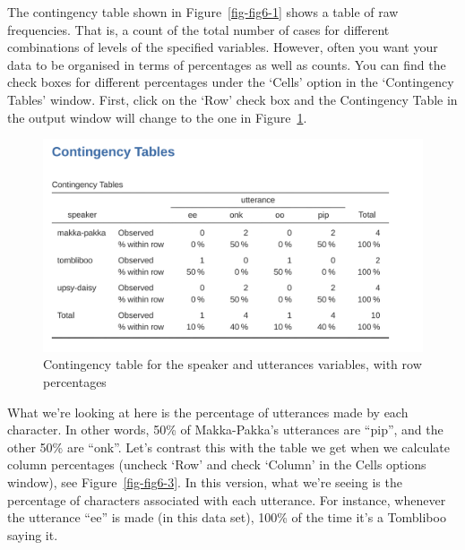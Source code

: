 \documentclass[
  a4paper,
]{book}
\begin{document}
The contingency table shown in Figure~\ref{fig-fig6-1} shows a table of
raw frequencies. That is, a count of the total number of cases for
different combinations of levels of the specified variables. However,
often you want your data to be organised in terms of percentages as well
as counts. You can find the check boxes for different percentages under
the `Cells' option in the `Contingency Tables' window. First, click on
the `Row' check box and the Contingency Table in the output window will
change to the one in Figure~\ref{fig-fig6-2}.

\begin{figure}

\includegraphics[width=1\textwidth,height=\textheight]{images/fig6-2.png} \hfill{}

\caption{\label{fig-fig6-2}Contingency table for the speaker and
utterances variables, with row percentages}

\end{figure}

What we're looking at here is the percentage of utterances made by each
character. In other words, 50\% of Makka-Pakka's utterances are ``pip'',
and the other 50\% are ``onk''. Let's contrast this with the table we
get when we calculate column percentages (uncheck `Row' and check
`Column' in the Cells options window), see Figure~\ref{fig-fig6-3}. In
this version, what we're seeing is the percentage of characters
associated with each utterance. For instance, whenever the utterance
``ee'' is made (in this data set), 100\% of the time it's a Tombliboo
saying it.
\end{document}
